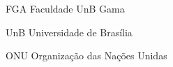 \begin{siglas}
  \item[FGA] Faculdade UnB Gama
   \item[UnB] Universidade de Brasília
     \item[ONU] Organização das Nações Unidas
\end{siglas}
